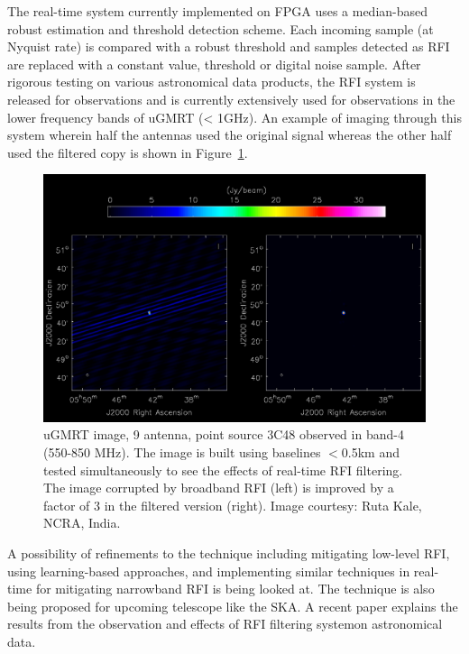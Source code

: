 \begin{itemize}
The real-time system currently implemented on FPGA \citep{buch2019real} uses a median-based robust estimation and threshold detection scheme. Each incoming sample (at Nyquist rate) is compared with a robust threshold and samples detected as RFI are replaced with a constant value, threshold or digital noise sample. After rigorous testing on various astronomical data products, the RFI system is released for observations and is currently extensively used for observations in the lower frequency bands of uGMRT (< 1GHz). An example of imaging through this system wherein half the antennas used the original signal whereas the other half used the filtered copy \citep{buch2022performance} is shown in Figure~\ref{fig:ugmrt-b4-image}. \\

\begin{figure}
    \includegraphics[scale=0.4]{Hardware Excision Techniques/figures/band4_point_source_rfi_filtering.png}
    \caption{uGMRT image, 9 antenna, point source 3C48 observed in band-4 (550-850 MHz). The image is built using baselines $<$0.5km and tested simultaneously to see the effects of real-time RFI filtering. The image corrupted by broadband RFI (left) is improved by a factor of 3 in the filtered version (right). Image courtesy: Ruta Kale, NCRA, India.
}
    \label{fig:ugmrt-b4-image}
\end{figure}

A possibility of refinements to the technique including mitigating low-level RFI, using learning-based approaches, and implementing similar techniques in real-time for mitigating narrowband RFI \citep{buch2016real} is being looked at. The technique is also being proposed \citep{buch2023real}for upcoming telescope like the SKA. A recent paper \citep{santra2024deep} explains the results from the observation and effects of RFI filtering systemon astronomical data.\\



\end{itemize}

